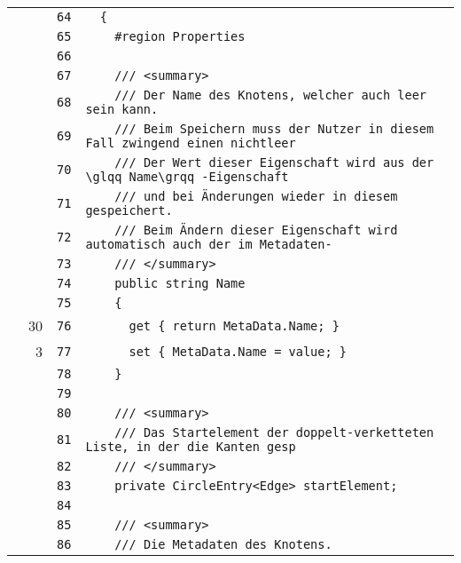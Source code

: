 \documentclass[a4paper,10pt]{article}
\begin{document}
\begin{longtable}[l]{lrrl}
\cellcolor{gray} &  & \verb~64~ & \verb~  {~\\
\cellcolor{gray} &  & \verb~65~ & \verb~    #region Properties~\\
\cellcolor{gray} &  & \verb~66~ & \verb~~\\
\cellcolor{gray} &  & \verb~67~ & \verb~    /// <summary>~\\
\cellcolor{gray} &  & \verb~68~ & \verb~    /// Der Name des Knotens, welcher auch leer sein kann.~\\
\cellcolor{gray} &  & \verb~69~ & \verb~    /// Beim Speichern muss der Nutzer in diesem Fall zwingend einen nichtleer~\\
\cellcolor{gray} &  & \verb~70~ & \verb~    /// Der Wert dieser Eigenschaft wird aus der \glqq Name\grqq -Eigenschaft ~\\
\cellcolor{gray} &  & \verb~71~ & \verb~    /// und bei Änderungen wieder in diesem gespeichert.~\\
\cellcolor{gray} &  & \verb~72~ & \verb~    /// Beim Ändern dieser Eigenschaft wird automatisch auch der im Metadaten-~\\
\cellcolor{gray} &  & \verb~73~ & \verb~    /// </summary>~\\
\cellcolor{gray} &  & \verb~74~ & \verb~    public string Name~\\
\cellcolor{gray} &  & \verb~75~ & \verb~    {~\\
\cellcolor{green} & 30 & \verb~76~ & \verb~      get { return MetaData.Name; }~\\
\cellcolor{green} & 3 & \verb~77~ & \verb~      set { MetaData.Name = value; }~\\
\cellcolor{gray} &  & \verb~78~ & \verb~    }~\\
\cellcolor{gray} &  & \verb~79~ & \verb~~\\
\cellcolor{gray} &  & \verb~80~ & \verb~    /// <summary>~\\
\cellcolor{gray} &  & \verb~81~ & \verb~    /// Das Startelement der doppelt-verketteten Liste, in der die Kanten gesp~\\
\cellcolor{gray} &  & \verb~82~ & \verb~    /// </summary>~\\
\cellcolor{gray} &  & \verb~83~ & \verb~    private CircleEntry<Edge> startElement;~\\
\cellcolor{gray} &  & \verb~84~ & \verb~~\\
\cellcolor{gray} &  & \verb~85~ & \verb~    /// <summary>~\\
\cellcolor{gray} &  & \verb~86~ & \verb~    /// Die Metadaten des Knotens.~\\

\end{longtable}
\end{document}

